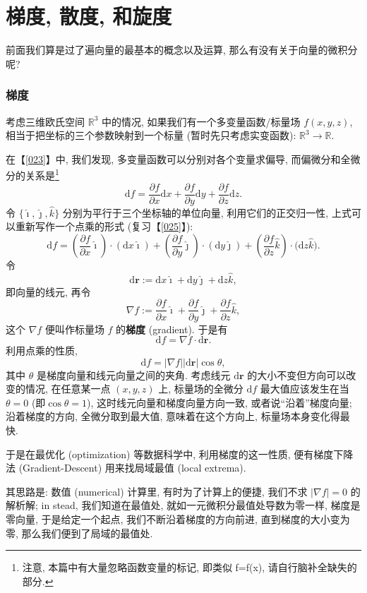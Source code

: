 \section{梯度, 散度, 和旋度}\label{028}

前面我们算是过了遍向量的最基本的概念以及运算,
那么有没有关于向量的微积分呢?

\subsubsection{梯度}

考虑三维欧氏空间 \(\mathbb{R}^3\) 中的情况,
如果我们有一个多变量函数/标量场 \(f(x,y,z)\),
相当于把坐标的三个参数映射到一个标量 (暂时先只考虑实变函数):
\(\mathbb{R}^3\rightarrow\mathbb{R}\).

在【\ref{023}】中, 我们发现, 多变量函数可以分别对各个变量求偏导,
而偏微分和全微分的关系是\footnote{注意, 本篇中有大量忽略函数变量的标记,
  即类似 f=f(x), 请自行脑补全缺失的部分.} \[
\mathrm{d}f=\frac{\partial f}{\partial x}\mathrm{d}x+\frac{\partial f}{\partial y}\mathrm{d}y+\frac{\partial f}{\partial z}\mathrm{d}z.
\] 令 \(\{\hat{\imath},\hat{\jmath},\hat{k}\}\)
分别为平行于三个坐标轴的单位向量, 利用它们的正交归一性,
上式可以重新写作一个点乘的形式 (复习【\ref{025}】): \[
\mathrm{d}f=\left(\frac{\partial f}{\partial x}\hat{\imath}\right)\cdot\left(\mathrm{d}x\hat{\imath}\right)+\left(\frac{\partial f}{\partial y}\hat{\jmath}\right)\cdot\left(\mathrm{d}y\hat{\jmath}\right)+\left(\frac{\partial f}{\partial z}\hat{k}\right)\cdot\big(\mathrm{d}z\hat{k}\big).
\] 令 \[
\mathrm{d}\boldsymbol{r}:=\mathrm{d}x\hat{\imath}+\mathrm{d}y\hat{\jmath}+\mathrm{d}z\hat{k},
\] 即向量的线元, 再令 \[
\boxed{\nabla f:=\frac{\partial f}{\partial x}\hat{\imath}+\frac{\partial f}{\partial y}\hat{\jmath}+\frac{\partial f}{\partial z}\hat{k},}
\] 这个 \(\nabla f\) 便叫作标量场 \(f\) 的\textbf{梯度} (gradient).
于是有 \[
\mathrm{d}f=\nabla f\cdot \mathrm{d}\boldsymbol{r}.
\] 利用点乘的性质, \[
\mathrm{d}f=|\nabla f||\mathrm{d}\boldsymbol{r}|\cos\theta,
\] 其中 \(\theta\) 是梯度向量和线元向量之间的夹角. 考虑线元
\(\mathrm{d}\boldsymbol{r}\) 的大小不变但方向可以改变的情况,
在任意某一点 \((x,y,z)\) 上, 标量场的全微分 \(\mathrm{d}f\)
最大值应该发生在当 \(\theta=0\) (即\(\cos\theta=1\)),
这时线元向量和梯度向量方向一致, 或者说``沿着''梯度向量; 沿着梯度的方向,
全微分取到最大值, 意味着在这个方向上, 标量场本身变化得最快.

\begin{newquote}
于是在最优化 (optimization) 等数据科学中, 利用梯度的这一性质,
便有梯度下降法 (Gradient-Descent) 用来找局域最值 (local extrema).

其思路是: 数值 (numerical) 计算里, 有时为了计算上的便捷, 我们不求
\(|\nabla f|=0\) 的解析解; in stead, 我们知道在最值处,
就如一元微积分最值处导数为零一样, 梯度是零向量, 于是给定一个起点,
我们不断沿着梯度的方向前进, 直到梯度的大小变为零,
那么我们便到了局域的最值处.
\end{newquote}

